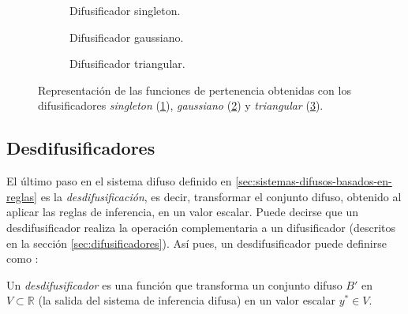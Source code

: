 \begin{figure}[H]
	\centering
	\begin{subfigure}[t]{\textwidth}
		\setlength\figureheight{4cm}
		\setlength\figurewidth{12cm}
		
		\caption{Difusificador singleton.}
		\label{fig:fuzzifier-singleton}
	\end{subfigure}
	
	\vspace{1 cm}
	\begin{subfigure}[t]{\textwidth}
		\setlength\figureheight{4cm}
		\setlength\figurewidth{12cm}
		
		\caption{Difusificador gaussiano.}
		\label{fig:fuzzifier-gaussian}
	\end{subfigure}
	
	\vspace{1 cm}
	\begin{subfigure}[t]{\textwidth}
		\setlength\figureheight{4cm}
		\setlength\figurewidth{12cm}
		
		\caption{Difusificador triangular.}
		\label{fig:fuzzifier-triangular}
	\end{subfigure}
		\caption{Representación de las funciones de pertenencia obtenidas con los difusificadores \emph{singleton} (\ref{fig:fuzzifier-singleton}), \emph{gaussiano} (\ref{fig:fuzzifier-gaussian}) y \emph{triangular} (\ref{fig:fuzzifier-triangular}).}
		\label{fig:fuzzifiers}
\end{figure}

\subsection{Desdifusificadores}
El último paso en el sistema difuso definido en \ref{sec:sistemas-difusos-basados-en-reglas} es la \emph{desdifusificación}, es decir, transformar el conjunto difuso, obtenido al aplicar las reglas de inferencia, en un valor escalar. Puede decirse que un desdifusificador realiza la operación complementaria a un difusificador (descritos en la sección \ref{sec:difusificadores}). Así pues, un desdifusificador puede definirse como \cite{wang1997}:

\begin{definition}
Un \emph{desdifusificador} es una función que transforma un conjunto difuso $B'$ en $V \subset \mathbb{R}$ (la salida del sistema de inferencia difusa) en un valor escalar $y^* \in V$.
\end{definition}

